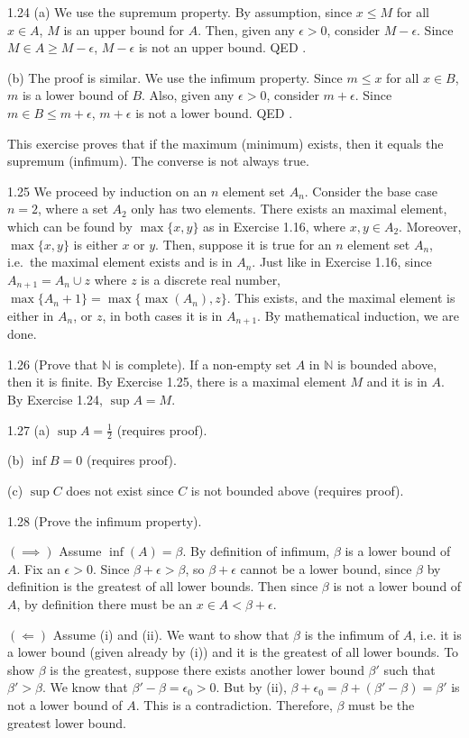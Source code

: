 1.24 (a) We use the supremum property. By assumption, since $x\leq M$ for all $x \in A$, $M$ is an upper bound for $A$. Then, given any $\epsilon>0$, consider $M-\epsilon$. Since $M \in A \geq M-\epsilon$, $M-\epsilon$ is not an upper bound. QED \@.

(b) The proof is similar. We use the infimum property. Since $m \leq x$ for all $x \in B$, $m$ is a lower bound of $B$. Also, given any $\epsilon>0$, consider $m+\epsilon$. Since $m \in B \leq m+\epsilon$, $m+\epsilon$ is not a lower bound. QED \@.

\begin{remark}
This exercise proves that if the maximum (minimum) exists, then it equals the supremum (infimum). The converse is not always true.
\end{remark}

1.25 We proceed by induction on an $n$ element set $A_n$. Consider the base case $n=2$, where a set $A_2$ only has two elements. There exists an maximal element, which can be found by $\max\{x,y\}$ as in Exercise 1.16, where $x,y \in A_2$. Moreover, $\max\{x,y\}$ is either $x$ or $y$. Then, suppose it is true for an $n$ element set $A_n$, i.e.\ the maximal element exists and is in $A_n$. Just like in Exercise 1.16, since $A_{n+1}=A_n \cup z$ where $z$ is a discrete real number, $\max\{A_n+1\}=\max\{\max(A_n),z\}$. This exists, and the maximal element is either in $A_n$, or $z$, in both cases it is in $A_{n+1}$. By mathematical induction, we are done. 

1.26 (Prove that $\mathbb{N}$ is complete). If a non-empty set $A$ in $\mathbb{N}$ is bounded above, then it is finite. By Exercise 1.25, there is a maximal element $M$ and it is in $A$. By Exercise 1.24, $\sup A=M$. 

1.27 (a) $\sup A = \frac{1}{2}$ (requires proof).

(b) $\inf B = 0$ (requires proof).

(c) $\sup C$ does not exist since $C$ is not bounded above (requires proof).

1.28 (Prove the infimum property). 

$(\implies)$ Assume $\inf(A)=\beta$. By definition of infimum, $\beta$ is a lower bound of $A$. Fix an $\epsilon >0$. Since $\beta+\epsilon > \beta$, so $\beta+\epsilon$ cannot be a lower bound, since $\beta$ by definition is the greatest of all lower bounds.  Then since $\beta$ is not a lower bound of $A$, by definition there must be an $x \in A < \beta+\epsilon$. 

$(\Longleftarrow)$ Assume (i) and (ii). We want to show that $\beta$ is the infimum of $A$, i.e. it is a lower bound (given already by (i)) and it is the greatest of all lower bounds. To show $\beta$ is the greatest, suppose there exists another lower bound $\beta'$ such that $\beta' > \beta$. We know that $\beta' - \beta = \epsilon_0 > 0$. But by (ii), $\beta + \epsilon_0 = \beta + (\beta' - \beta) = \beta'$ is not a lower bound of $A$. This is a contradiction. Therefore, $\beta$ must be the greatest lower bound. 

